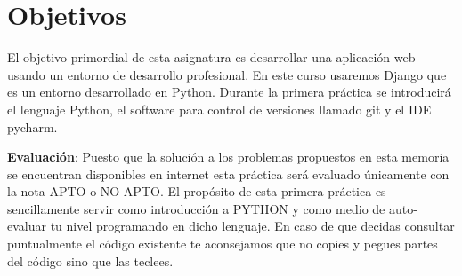 \documentclass[12pt]{article} %
\begin{document}

\tableofcontents %

\newpage %


\section {Objetivos}

El objetivo primordial de esta asignatura es desarrollar una aplicación web usando un entorno de desarrollo profesional. En este curso usaremos Django que es un entorno desarrollado en Python.
Durante la primera pr\'{a}ctica se introducirá el lenguaje Python, el software para control 
de versiones llamado git y el IDE pycharm.





\textbf{Evaluación}: Puesto que la soluci\'on a los problemas propuestos en esta memoria se encuentran disponibles en internet esta práctica será evaluado \'unicamente con la nota APTO o NO APTO. El propósito de esta primera pr\'actica es sencillamente servir como introducción a PYTHON y como medio de auto-evaluar tu nivel programando en dicho lenguaje. En caso de que decidas consultar puntualmente el c\'odigo existente te aconsejamos que no copies 
y pegues partes del c\'odigo sino que las teclees. 
\end{document}
